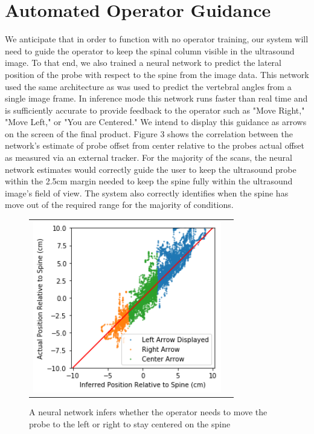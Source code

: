 \documentclass{article}
\begin{document}
\section{Automated Operator Guidance}
We anticipate that in order to function with no operator training, our system will need to guide the operator to keep the spinal column visible in the ultrasound image. To that end, we also trained a neural network
to predict the lateral position of the probe with respect to the spine from the image data. This network used the same architecture as was used to predict the vertebral angles from a single image frame. In inference mode this network runs faster than real time and is sufficiently accurate to provide feedback to the operator such as "Move Right," "Move Left," or "You are Centered." We intend to display this guidance as arrows on the screen of the final product.  Figure 3 shows the correlation between the network's estimate of probe offset from center relative to the probes actual offset as measured via an external tracker.  For the majority of the scans, the neural network estimates would correctly guide the user to keep the ultrasound probe within the 2.5cm margin needed to keep the spine fully within the ultrasound image's field of view. The system also correctly identifies when the spine has move out of the required range for the majority of conditions.

\begin{figure}
\centering
\begin{tabular}{cc}
\centering
\includegraphics[height=7.5cm,keepaspectratio]{Guidance}
\end{tabular}
\caption{A neural network infers whether the operator needs to move the probe to the left or right to stay centered on the spine
}
\end{figure}
\end{document}
